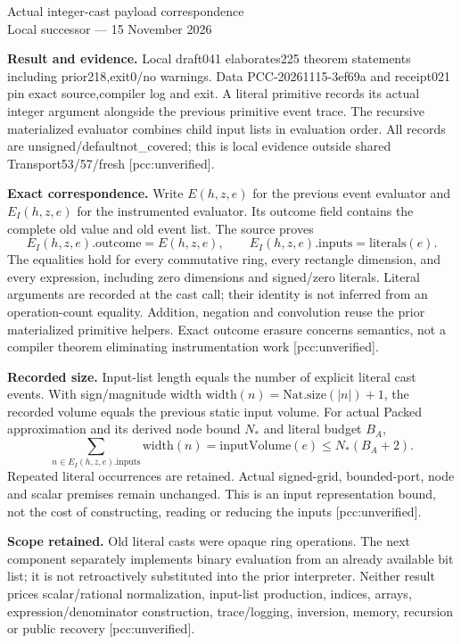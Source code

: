 \documentclass[10pt]{article}
\begin{document}
\begin{center}{\Large Actual integer-cast payload correspondence}\\[4pt]
Local successor --- 15 November 2026\end{center}
\textbf{Result and evidence.} Local draft041 elaborates225 theorem statements
including prior218,exit0/no warnings. Data PCC-20261115-3ef69a and receipt021
pin exact source,compiler log and exit. A literal primitive records its actual
integer argument alongside the previous primitive event trace. The recursive
materialized evaluator combines child input lists in evaluation order.
All records are unsigned/defaultnot\_covered; this is local evidence outside
shared Transport53/57/fresh [pcc:unverified].

\textbf{Exact correspondence.} Write $E(h,z,e)$ for the previous event evaluator
and $E_I(h,z,e)$ for the instrumented evaluator. Its outcome field
contains the complete old value and old event list. The source proves
\[
 E_I(h,z,e).\mathrm{outcome}=E(h,z,e),\qquad
 E_I(h,z,e).\mathrm{inputs}=\mathrm{literals}(e).
\]
The equalities hold for every commutative ring, every rectangle dimension,
and every expression, including zero dimensions and signed/zero literals.
Literal arguments are recorded at the cast call; their identity is not inferred
from an operation-count equality. Addition, negation and convolution reuse the
prior materialized primitive helpers. Exact outcome erasure concerns semantics,
not a compiler theorem eliminating instrumentation work [pcc:unverified].

\textbf{Recorded size.} Input-list length equals the number of explicit literal
cast events. With sign/magnitude width
$\mathrm{width}(n)=\mathrm{Nat.size}(|n|)+1$, the recorded volume equals the
previous static input volume. For actual Packed approximation and its derived
node bound $N_*$ and literal budget $B_A$,
\[
 \sum_{n\in E_I(h,z,e).\mathrm{inputs}}\mathrm{width}(n)
 =\mathrm{inputVolume}(e)\le N_*(B_A+2).
\]
Repeated literal occurrences are retained. Actual signed-grid, bounded-port,
node and scalar premises remain unchanged. This is an input representation
bound, not the cost of constructing, reading or reducing the inputs
[pcc:unverified].

\textbf{Scope retained.} Old literal casts were opaque ring operations. The
next component separately implements binary evaluation from an already available
bit list; it is not retroactively substituted into the prior interpreter.
Neither result prices scalar/rational normalization, input-list production,
indices, arrays, expression/denominator construction, trace/logging, inversion,
memory, recursion or public recovery [pcc:unverified].
\end{document}
